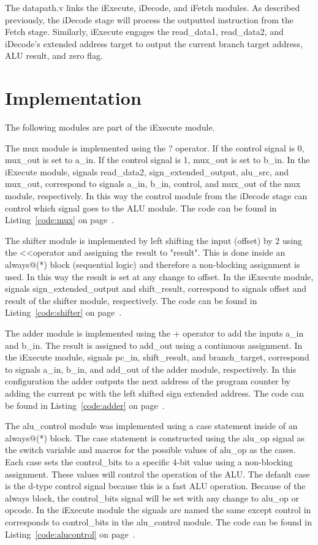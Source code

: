 \documentclass{article}
\begin{document}
The datapath.v links the iExecute, iDecode, and iFetch modules. As described previously, the iDecode stage will process the outputted instruction from the Fetch stage. Similarly, iExecute engages the read\_data1, read\_data2, and iDecode's extended address target to output the current branch target address, ALU result, and zero flag.

\section{Implementation}
The following modules are part of the iExecute module.

The mux module is implemented using the ? operator. If the control signal is 0, mux\_out is set to a\_in. If the control signal is 1, mux\_out is set to b\_in. In the iExecute module, signals read\_data2, sign\_extended\_output, alu\_src, and mux\_out, correspond to signals a\_in, b\_in, control, and mux\_out of the mux module, respectively. In this way the control module from the iDecode stage can control which signal goes to the ALU module. The code can be found in Listing~\ref{code:mux} on page~\pageref{code:mux}.

The shifter module is implemented by left shifting the input (offset) by 2 using the  \textless\textless\space operator and assigning the result to "result". This is done inside an always@(*) block (sequential logic) and therefore a non-blocking assignment is used. In this way the result is set at any change to offset. In the iExecute module, signals sign\_extended\_output and shift\_result, correspond to signals offset and result of the shifter module, respectively. The code can be found in Listing~\ref{code:shifter} on page~\pageref{code:shifter}.

The adder module is implemented using the + operator to add the inputs a\_in and b\_in. The result is assigned to add\_out using a continuous assignment. In the iExecute module, signals pc\_in, shift\_result, and branch\_target, correspond to signals a\_in, b\_in, and add\_out of the adder module, respectively. In this configuration the adder outputs the next address of the program counter by adding the current pc with the left shifted sign extended address. The code can be found in Listing~\ref{code:adder} on page~\pageref{code:adder}. 

The alu\_control module was implemented using a case statement inside of an always@(*) block. The case statement is constructed using the alu\_op signal as the switch variable and macros for the possible values of alu\_op as the cases. Each case sets the control\_bits to a specific 4-bit value using a non-blocking assignment. These values will control the operation of the ALU. The default case is the d-type control signal because this is a fast ALU operation. Because of the always block, the control\_bits signal will be set with any change to alu\_op or opcode. In the iExecute module the signals are named the same except control in corresponds to control\_bits in the alu\_control module. The code can be found in Listing~\ref{code:alucontrol} on page~\pageref{code:alucontrol}.
\end{document}
